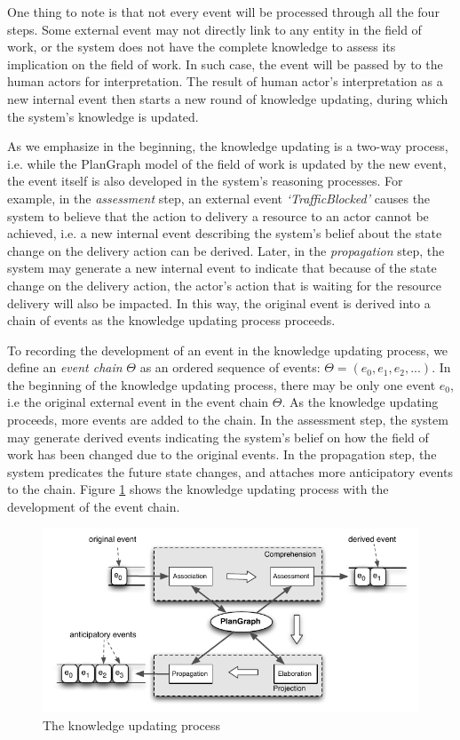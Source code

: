 One thing to note is that not every event will be processed through all the four steps. Some external event may not directly link to any entity in the field of work, or the system does not have the complete knowledge to assess its implication on the field of work. In such case, the event will be passed by to the human actors for interpretation. The result of human actor's interpretation as a new internal event then starts a new round of knowledge updating, during which the system's knowledge is updated.

As we emphasize in the beginning, the knowledge updating is a two-way process, i.e. while the PlanGraph model of the field of work is updated by the new event, the event itself is also developed in the system's reasoning processes. For example, in the \emph{assessment} step, an external event \emph{`TrafficBlocked'} causes the system to believe that the action to delivery a resource to an actor cannot be achieved, i.e. a new internal event describing the system's belief about the state change on the delivery action can be derived. Later, in the \emph{propagation} step, the system may generate a new internal event to indicate that because of the state change on the delivery action, the actor's action that is waiting for the resource delivery will also be impacted. In this way, the original event is derived into a chain of events as the knowledge updating process proceeds.

To recording the development of an event in the knowledge updating process, we define an \emph{event chain} $\Theta$ as an ordered sequence of events: $\Theta=(e_0, e_1, e_2, ...)$. In the beginning of the knowledge updating process, there may be only one event $e_0$, i.e the original external event in the event chain $\Theta$. As the knowledge updating proceeds, more events are added to the chain. In the assessment step, the system may generate derived events indicating the system's belief on how the field of work has been changed due to the original events. In the propagation step, the system predicates the future state changes, and attaches more anticipatory events to the chain. Figure \ref{fig:knowledge_updating} shows the knowledge updating process with the development of the event chain.
\begin{figure}[htbp] %
	\centering
	\includegraphics{knowledge_updating.pdf} 
	\caption{The knowledge updating process}
	\label{fig:knowledge_updating}
\end{figure}

